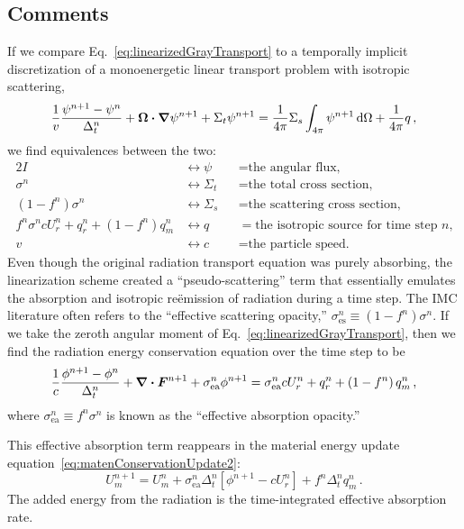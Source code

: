 \subsection{Comments}\label{bgSIComments}
If we compare Eq.~\eqref{eq:linearizedGrayTransport} to a temporally implicit
discretization of a monoenergetic linear transport problem with isotropic
scattering,
\begin{equation*}
  \frac{1}{v} \frac{\psi^{n+1} - \psi^n}{\Delta_t^n} 
  + \bm{\Omega} \bm{\cdot} \bm{\nabla} \psi^{n+1}
 + \Sigma_t \psi^{n+1}
 = \frac{1}{4\pi} \Sigma_s \int_{4\pi} \psi^{n+1}\mathop{}\!\mathrm{d} \Omega
  + \frac{1}{4\pi} q \,,
\end{equation*}
we find equivalences between the two:
\begin{alignat*}{2}
  I &\leftrightarrow \psi &&= \text{the angular flux,}
  \\
  \sigma^n &\leftrightarrow \Sigma_t &&= \text{the total cross section,}
  \\
  \left(1 - f^n\right) \sigma^n &\leftrightarrow \Sigma_s &&= \text{the scattering cross
  section,} 
  \\
  f^n \sigma^n c U_r^n + q_r^n + \left(1 - f^n\right) q_m^n &\leftrightarrow q &&= \text{the isotropic source for time
  step $n$,}
  \\
  v   &\leftrightarrow c &&= \text{the particle speed.}
\end{alignat*}
Even though the original radiation transport equation was purely
absorbing, the linearization scheme created a ``pseudo-scattering''
term that essentially emulates the absorption and isotropic re\"emission of
radiation during a time step. The IMC literature often refers to the
``effective scattering opacity,''
$\sigma_\text{es}^n \equiv \left(1 - f^n\right) \sigma^n$.
If we take the zeroth angular moment of
Eq.~\eqref{eq:linearizedGrayTransport}, then we find the radiation
energy conservation equation over the time step to be
\begin{equation}\label{eq:semiImplicitZeroth}
  \frac{1}{c} \frac{\phi^{n+1} - \phi^n}{\Delta_t^n}
  + \bm{\nabla} \bm{\cdot} \bm{F}^{n+1} +\sigma_\text{ea}^n \phi^{n+1}
 =  \sigma_\text{ea}^n c U_r^n + q_r^n + \left(1 - f^n\right) q_m^n \,,
\end{equation}
where $\sigma_\text{ea}^n \equiv f^n\sigma^n$ is known as the
``effective absorption opacity.''

This effective absorption term reappears in the material energy update
equation~\eqref{eq:matenConservationUpdate2}:
\begin{equation*}
  U_m^{n+1} = U_m^n + \sigma_\text{ea}^n \Delta_t^n
  \left[ \phi^{n+1} - c U_r^n \right] + f^n \Delta_t^n q_m^n \,.
\end{equation*}
The added energy from the radiation is the time-integrated effective absorption
rate.

